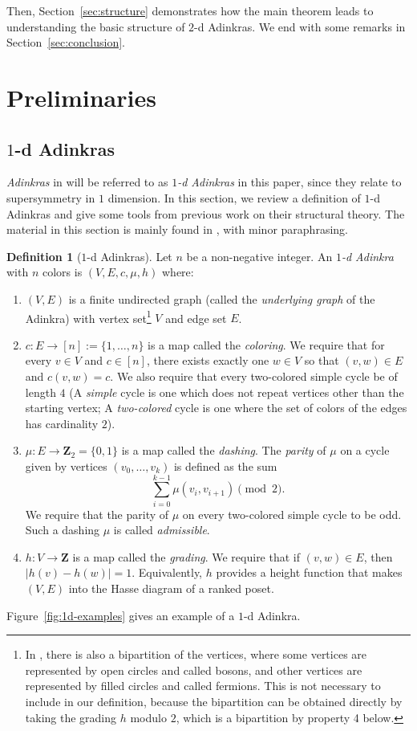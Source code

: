 \documentclass[12pt,twoside,singlespace]{article}
\numberwithin{equation}{section}
\theoremstyle{definition}
\newtheorem{definition}[equation]{Definition}
\newcommand{\ZZ}{\mathbf{Z}}
\begin{document}
Then, Section~\ref{sec:structure} demonstrates how the main theorem leads to understanding the basic structure of $2$-d Adinkras. We end with some remarks in Section~\ref{sec:conclusion}.

\section{Preliminaries}
\label{sec:prelim}

\subsection{$1$-d Adinkras}
\label{sec:1d}
\emph{Adinkras} in \cite{d2l:first,d2l:graph-theoretic,zhang:adinkras} will be referred to as \emph{$1$-d Adinkras} in this paper, since they relate to supersymmetry in $1$ dimension. In this section, we  review a definition of $1$-d Adinkras and give some tools from previous work on their structural theory. The material in this section is mainly found in \cite{d2l:omni,zhang:adinkras}, with minor paraphrasing. 


\begin{definition}[$1$-d Adinkras]
Let $n$ be a non-negative integer.  An \emph{$1$-d Adinkra} with $n$ colors is $(V,E,c,\mu,h)$ where: 

\begin{enumerate}
\item $(V,E)$ is a finite undirected graph (called the \emph{underlying graph} of the Adinkra) with vertex set\footnote{In \cite{d2l:first,d2l:graph-theoretic}, there is also a bipartition of the vertices, where some vertices are represented by open circles and called bosons, and other vertices are represented by filled circles and called fermions.  This is not necessary to include in our definition, because the bipartition can be obtained directly by taking the grading $h$ modulo $2$, which is a bipartition by property 4 below.} $V$ and edge set $E$.
\item $c:E\to [n] := \{1,\ldots,n\}$ is a map called the \emph{coloring}. We require that for every $v\in V$ and $c \in [n]$, there exists exactly one $w\in V$ so that $(v,w)\in E$ and $c(v,w)=c$. We also require that every two-colored simple cycle be of length $4$ (A \emph{simple} cycle is one which does not repeat vertices other than the starting vertex; A \emph{two-colored} cycle is one where the set of colors of the edges has cardinality $2$).
\item $\mu:E\to \ZZ_2=\{0,1\}$ is a map called the \emph{dashing}.  The \emph{parity} of $\mu$ on a cycle given by vertices $(v_0,\ldots,v_k)$ is defined as the sum
\[\sum_{i=0}^{k-1}\mu(v_i,v_{i+1})\pmod{2}.\]
We require that the parity of $\mu$ on every two-colored simple cycle to be odd. Such a dashing $\mu$ is called \emph{admissible}.
\item $h:V\to\ZZ$ is a map called the \emph{grading}. We require that if $(v,w)\in E$, then $|h(v)-h(w)|=1$. Equivalently, $h$ provides a height function that makes $(V,E)$ into the Hasse diagram of a ranked poset.
\end{enumerate}

Figure~\ref{fig:1d-examples} gives an example of a $1$-d Adinkra.
\end{definition}
\end{document}
